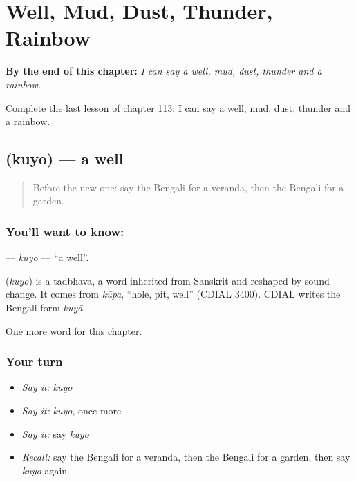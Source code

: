 
\chapter{Well, Mud, Dust, Thunder, Rainbow}
\label{ch:bn-well-mud-dust-thunder-rainbow}

\begin{chapteropening}
\textbf{By the end of this chapter:} \emph{I can say a well, mud, dust, thunder and a rainbow.}

Complete the last lesson of chapter 113: I can say a well, mud, dust, thunder and a rainbow.
\end{chapteropening}

\section[\texorpdfstring{\bn{কুয়ো} (kuyo)}{কুয়ো (kuyo)}]{ (kuyo) — a well}

\label{lesson:BN-C113-kuyo}



\begin{quote}
Before the new one: say the Bengali for a veranda, then the Bengali for a garden.
\end{quote}

\subsection*{You'll want to know: }
\textbf{} — \emph{kuyo} — \textquotedblleft{}a well\textquotedblright{}.

\begin{cousinweb}
\textbf{} (\emph{kuyo}) is a tadbhava, a word inherited from Sanskrit and reshaped by sound change. It comes from \emph{kūpa}, \textquotedblleft{}hole, pit, well\textquotedblright{} (CDIAL 3400). CDIAL writes the Bengali form \emph{kuyā}.
\end{cousinweb}

\begin{grammarlens}[title={What you've built}]
One more word for this chapter.
\end{grammarlens}

\subsection*{Your turn}
\begin{itemize}
\raggedright
  \item \emph{Say it:} \emph{kuyo}
  \item \emph{Say it:} \emph{kuyo}, once more
  \item \emph{Say it:} say \emph{kuyo}
  \item \emph{Recall:} say the Bengali for a veranda, then the Bengali for a garden, then say \emph{kuyo} again
\end{itemize}

